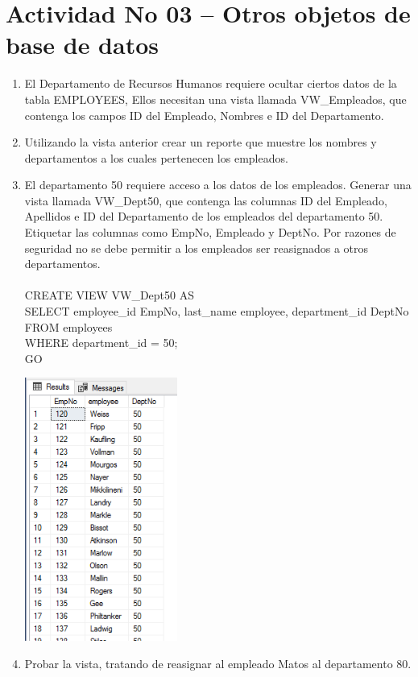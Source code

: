 \section{Actividad No 03 –  Otros objetos de base de datos} 
		
\begin{enumerate}[1.]
	\item El Departamento de Recursos Humanos requiere ocultar ciertos datos de la tabla EMPLOYEES, Ellos necesitan una vista llamada VW\_Empleados, que contenga los campos ID del Empleado, Nombres e ID del Departamento.
	\item Utilizando la vista anterior crear un reporte que muestre los nombres y departamentos a los cuales
pertenecen los empleados.
	\item El departamento 50 requiere acceso a los datos de los empleados. Generar una vista llamada VW\_Dept50, que contenga las columnas ID del Empleado, Apellidos e ID del Departamento de los empleados del departamento 50. Etiquetar las columnas como EmpNo, Empleado y DeptNo. Por razones de seguridad no se debe permitir a los empleados ser reasignados a otros departamentos.
	\\
	\\CREATE VIEW VW\_Dept50 AS
	\\SELECT employee\_id EmpNo, last\_name employee, department\_id DeptNo
	\\FROM employees
	\\WHERE department\_id = 50;
	\\GO
	\begin{center}
	\includegraphics[width=5cm]{./Imagenes/ejercicio3-3} 
	\end{center}
	\item Probar la vista, tratando de reasignar al empleado Matos al departamento 80.

\end{enumerate}
